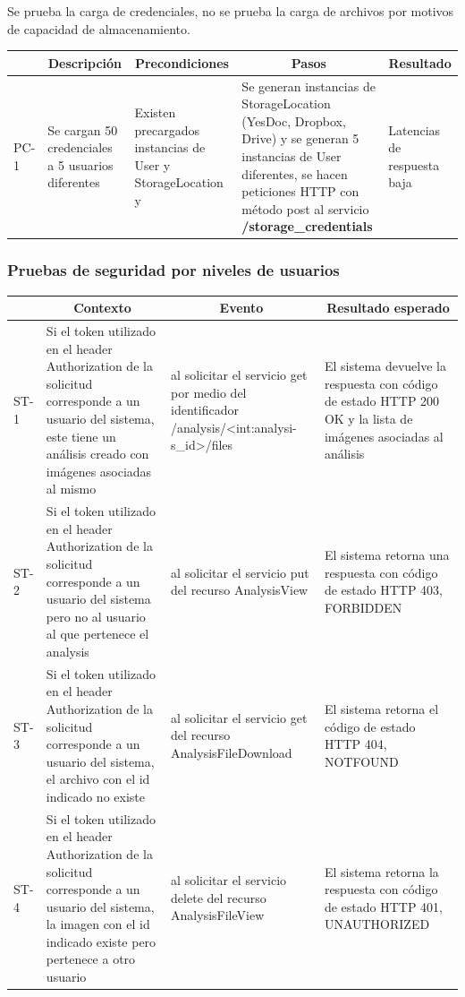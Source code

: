 Se prueba la carga de credenciales, no se prueba la carga de archivos por motivos de capacidad de almacenamiento.

\begin{longtable}{|p{1.0cm}|p{3cm}|p{3cm}|p{3.5cm}|p{2.5cm}|}
	\hline \hline
		\rowcolor[gray]{0.9} 
		\multicolumn{1}{|c|}{ID} & \multicolumn{1}{|c|}{Descripción} & \multicolumn{1}{c|}{Precondiciones} & \multicolumn{1}{c|}{Pasos} &
		\multicolumn{1}{c|}{Resultado} \\
	\hline
	PC-1 & Se cargan 50 credenciales a 5 usuarios diferentes  & Existen precargados instancias de User y StorageLocation y  & Se generan instancias de StorageLocation (YesDoc, Dropbox, Drive) y se generan 5 instancias de User diferentes, se hacen peticiones HTTP con método post al servicio \textbf{/storage\_credentials} & Latencias de respuesta baja %
	\\ \hline
	
\end{longtable}

\clearpage
\subsubsection{Pruebas de seguridad por niveles de usuarios}

\begin{longtable}{|p{1.0cm}|p{4cm}|p{4cm}|p{4cm}| }

	\hline
		\rowcolor[gray]{0.9} 
		\multicolumn{1}{|c}{Id test seguridad} & \multicolumn{1}{|c|}{Contexto} & \multicolumn{1}{|c|}{Evento} & \multicolumn{1}{|c|}{Resultado esperado} \\
	\hline
		ST-1 & Si el token utilizado en el header Authorization de la solicitud corresponde a un usuario del sistema, este tiene un análisis creado con imágenes asociadas al mismo  & al solicitar el servicio get por medio del identificador /analysis/<int:analysi-s\_id>/files & El sistema devuelve la respuesta con código de estado HTTP 200 OK y la lista de imágenes asociadas al análisis\\
	\hline
		ST-2 & Si el token utilizado en el header Authorization de la solicitud corresponde a un usuario del sistema pero no al usuario al que pertenece el analysis & al solicitar el servicio put del recurso AnalysisView & El sistema retorna una respuesta con código de estado HTTP 403, FORBIDDEN\\
	\hline
		ST-3 & Si el token utilizado en el header Authorization de la solicitud corresponde a un usuario del sistema, el archivo con el id indicado no existe & al solicitar el servicio get del recurso AnalysisFileDownload & El sistema retorna el código de estado HTTP 404, NOTFOUND\\
	\hline
		ST-4 & Si el token utilizado en el header Authorization de la solicitud corresponde a un usuario del sistema, la imagen con el id indicado existe pero pertenece a otro usuario  & al solicitar el servicio delete del recurso AnalysisFileView & El sistema retorna la respuesta con código de estado HTTP 401, UNAUTHORIZED\\
	\hline

\end{longtable}

